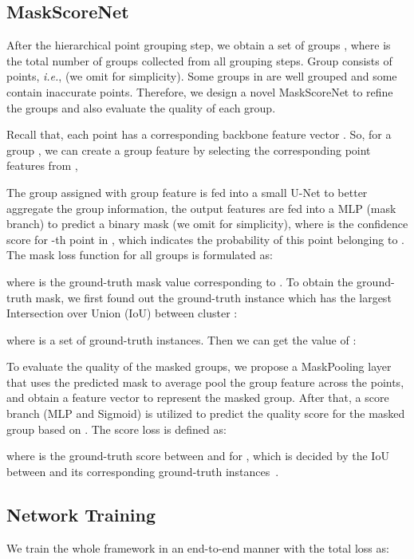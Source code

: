 \documentclass{article}
\newcommand{\ie}{\emph{i.e.}}
\begin{document}
\subsection{MaskScoreNet}

After the hierarchical point grouping step, we obtain a set of groups , where  is the total number of groups collected from all grouping steps.
Group   consists of  points, \ie,  (we omit  for simplicity).
Some groups in  are well grouped and some contain inaccurate points. Therefore, we design a novel MaskScoreNet to refine the groups  and also evaluate the quality of each group.

Recall that, each point  has a corresponding backbone feature vector .
So, for a group  , we can create a group feature  by selecting the corresponding point features from ,

The group  assigned with group feature  is fed into a small U-Net  to better aggregate the group information, the output features  are fed into a MLP (mask branch) to predict a binary mask  (we omit  for simplicity), 
where  is the confidence score for -th point in , which indicates the probability of this point belonging to . 
The mask loss function for all groups is formulated as:

where  is the ground-truth mask value corresponding to .
To obtain the ground-truth mask, we first found out the ground-truth instance  which has the largest Intersection over Union (IoU) between cluster  :

where  is a set of ground-truth instances.
Then we can get the value of :


To evaluate the quality of the masked groups, we propose a MaskPooling layer that uses the predicted mask  to average pool the group feature  across the points, and obtain a feature vector  to represent the masked group.
After that, a  score branch (MLP and Sigmoid) is utilized to predict the quality score  for the masked group based on .
The score loss is defined as:

where  is the ground-truth score between  and  for , which is decided by the IoU between  and its corresponding ground-truth instances~\cite{jiang2018acquisition, li2019gs3d}.

\subsection{Network Training}

We train the whole framework in an end-to-end manner with the total loss as:
\end{document}
